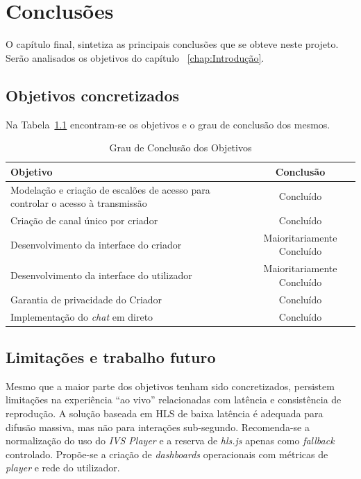 % 
\chapter{Conclusões} 
\label{chap:Conc} %

O capítulo final, sintetiza as principais conclusões que se obteve neste projeto. Serão analisados os objetivos do capítulo ~\ref{chap:Introdução}.


\section{Objetivos concretizados} 
\label{sec:desc} %

Na Tabela~\ref{tab:grau} encontram-se os objetivos e o grau de conclusão dos mesmos.

\begin{table}[H]
\caption{Grau de Conclusão dos Objetivos}
\label{tab:grau}
\begin{center}
\begin{tabular}{|p{8cm}|c|}
\hline
\textbf{Objetivo} & \textbf{Conclusão} \\ \hline
Modelação e criação de escalões de acesso para controlar o acesso à transmissão & Concluído \\ \hline
Criação de canal único por criador & Concluído \\ \hline
Desenvolvimento da interface do criador & Maioritariamente Concluído \\ \hline
Desenvolvimento da interface do utilizador & Maioritariamente Concluído \\ \hline
Garantia de privacidade do Criador & Concluído \\ \hline
Implementação do \textit{chat} em direto & Concluído \\ \hline
\end{tabular}
\end{center}
\end{table}

\section{Limitações e trabalho futuro} 

Mesmo que a maior parte dos objetivos tenham sido concretizados, persistem limitações na experiência “ao vivo” relacionadas com latência e consistência de reprodução. A solução baseada em HLS de baixa latência é adequada para difusão massiva, mas não para interações sub-segundo. Recomenda-se a normalização do uso do \textit{IVS Player} e a reserva de \textit{hls.js} apenas como \textit{fallback} controlado. Propõe-se a criação de \textit{dashboards} operacionais com métricas de \textit{player} e rede do utilizador.

